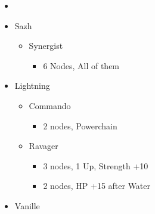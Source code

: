 \renewcommand{\first}{[1] Relentless Assault (\rav/\com/\rav)}
\renewcommand{\second}{[2] Bully (\syn/\com/\sab)}
\renewcommand{\third}{[3] Relentless Assault (\rav/\com/\rav)}
\renewcommand{\fourth}{[4] Smart Bomb (\rav/\rav/\sab)}
\renewcommand{\fifth}{[5] Tri-Disaster (\rav/\rav/\rav)}
\renewcommand{\sixth}{[6] Malevolence (\syn/\rav/\rav)}
	\begin{menu}
		\begin{itemize}
			\paradigm
			\begin{itemize}
				\item {}%
				      {\paradigmline{\rav}{\com}{\rav}}%
				      {\paradigmline{\syn}{\com}{\sab}}%
				      {\paradigmline{\rav}{\com}{(\rav)}}%
				      {\paradigmline[4]{\textit{\rav}}{\textit{\rav}}{\textit{\sab}}}%
				      {\paradigmline{\rav}{[\rav]}{\rav}}%
				      {\paradigmline{[\syn]}{[\rav]}{\rav}}
			\end{itemize}
			\columnbreak
			\crystarium
			\begin{itemize}
				\item Sazh
				      \begin{itemize}
					      \item Synergist
					            \begin{itemize}
						            \item 6 Nodes, All of them
					            \end{itemize}
				      \end{itemize}
				\item Lightning
				      \begin{itemize}
					      \item Commando
					            \begin{itemize}
						            \item 2 nodes, Powerchain
					            \end{itemize}
					      \item Ravager
					            \begin{itemize}
						            \item 3 nodes, 1 Up, Strength +10
						            \item 2 nodes, HP +15 after Water
					            \end{itemize}
				      \end{itemize}
				\item Vanille
				      \begin{itemize}

\end{itemize}
\end{itemize}
\end{itemize}
\end{menu}
